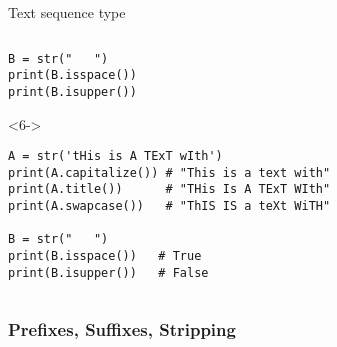 \begin{frame}[fragile]{Text sequence type}
\begin{columns}[onlytextwidth]
\begin{column}{\textwidth}
\begin{onlyenv}
\begin{lstlisting}[style=python]
B = str("   ")
print(B.isspace())
print(B.isupper()) \end{lstlisting}
      \end{onlyenv}

      \begin{onlyenv}<6->
        \begin{lstlisting}[style=python]
A = str('tHis is A TExT wIth')
print(A.capitalize()) # "This is a text with"
print(A.title())      # "THis Is A TExT WIth"
print(A.swapcase())   # "ThIS IS a teXt WiTH"

B = str("   ")
print(B.isspace())   # True
print(B.isupper())   # False \end{lstlisting}
      \end{onlyenv}

    \end{column}
  \end{columns}

\end{frame}


\subsubsection{Prefixes, Suffixes, Stripping}

